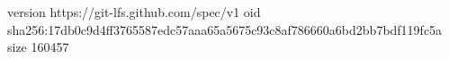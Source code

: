 version https://git-lfs.github.com/spec/v1
oid sha256:17db0c9d4ff3765587edc57aaa65a5675c93c8af786660a6bd2bb7bdf119fc5a
size 160457
